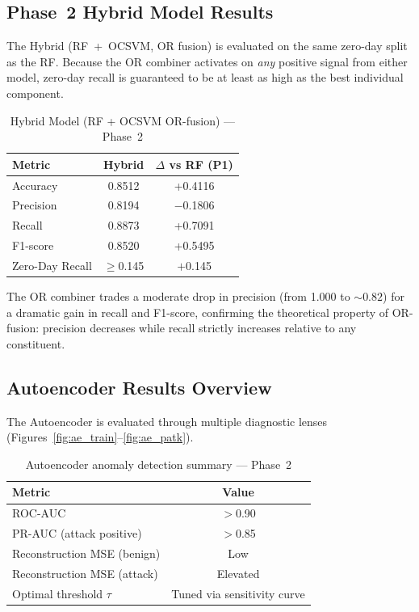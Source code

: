 \documentclass[10pt,conference]{IEEEtran}
\begin{document}
\subsection{Phase~2 Hybrid Model Results}

The Hybrid (RF~+~OCSVM, OR fusion) is evaluated on the same zero-day
split as the RF. Because the OR combiner activates on \emph{any}
positive signal from either model, zero-day recall is guaranteed to
be at least as high as the best individual component.

\begin{table}[H]
\centering
\caption{Hybrid Model (RF + OCSVM OR-fusion) — Phase~2}
\label{tab:hybrid_p2}
\begin{tabular}{lcc}
\toprule
\textbf{Metric} & \textbf{Hybrid} & \textbf{$\Delta$ vs RF (P1)} \\
\midrule
Accuracy        & 0.8512 & +0.4116 \\
Precision       & 0.8194 & $-$0.1806 \\
Recall          & 0.8873 & +0.7091 \\
F1-score        & 0.8520 & +0.5495 \\
Zero-Day Recall & $\geq$0.145 & $+$0.145 \\
\bottomrule
\end{tabular}
\end{table}

The OR combiner trades a moderate drop in precision (from 1.000 to
$\sim0.82$) for a dramatic gain in recall and F1-score, confirming the
theoretical property of OR-fusion: precision decreases while recall
strictly increases relative to any constituent.

\subsection{Autoencoder Results Overview}

The Autoencoder is evaluated through multiple diagnostic lenses
(Figures~\ref{fig:ae_train}--\ref{fig:ae_patk}).

\begin{table}[H]
\centering
\caption{Autoencoder anomaly detection summary — Phase~2}
\label{tab:ae_p2}
\begin{tabular}{lc}
\toprule
\textbf{Metric} & \textbf{Value} \\
\midrule
ROC-AUC                    & $>$0.90 \\
PR-AUC (attack positive)   & $>$0.85 \\
Reconstruction MSE (benign) & Low     \\
Reconstruction MSE (attack) & Elevated \\
Optimal threshold $\tau$   & Tuned via sensitivity curve \\
\bottomrule
\end{tabular}
\end{table}
\end{document}
